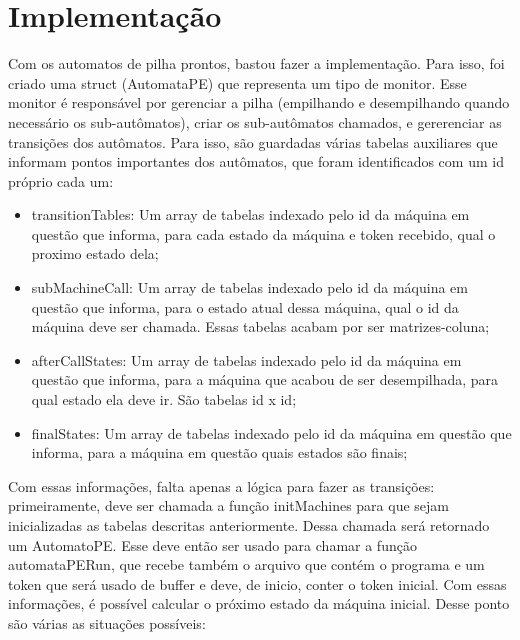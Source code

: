 \section{Implementação}
Com os automatos de pilha prontos, bastou fazer a implementação. Para isso, foi criado uma struct (AutomataPE) que representa um tipo de monitor. Esse monitor é responsável por gerenciar a pilha (empilhando e desempilhando quando necessário os sub-autômatos), criar os sub-autômatos chamados, e gererenciar as transições dos autômatos. Para isso, são guardadas várias tabelas auxiliares que informam pontos importantes dos autômatos, que foram identificados com um id próprio cada um:
\begin{itemize}
\item transitionTables: Um array de tabelas indexado pelo id da máquina em questão que informa, para cada estado da máquina e token recebido, qual o proximo estado dela; 
\item subMachineCall: Um array de tabelas indexado pelo id da máquina em questão que informa, para o estado atual dessa máquina, qual o id da máquina deve ser chamada. Essas tabelas acabam por ser matrizes-coluna;
\item afterCallStates: Um array de tabelas indexado pelo id da máquina em questão que informa, para a máquina que acabou de ser desempilhada, para qual estado ela deve ir. São tabelas id x id;
\item finalStates:  Um array de tabelas indexado pelo id da máquina em questão que informa, para a máquina em questão quais estados são finais;

\end{itemize}

Com essas informações, falta apenas a lógica para fazer as transições:
primeiramente, deve ser chamada a função initMachines para que sejam inicializadas as tabelas descritas anteriormente. Dessa chamada será retornado um AutomatoPE. Esse deve então ser usado para chamar a função automataPERun, que recebe também o arquivo que contém o programa e um token que será usado de buffer e deve, de inicio, conter o token inicial. Com essas informações, é possível calcular o próximo estado da máquina inicial. Desse ponto são várias as situações possíveis:

